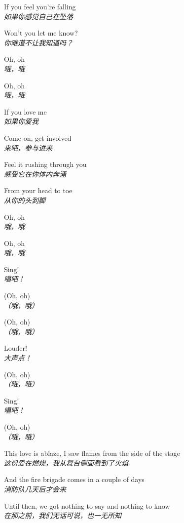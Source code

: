 \begin{spacing}{1.5}
\begin{flushleft}
If you feel you're falling\\
\textit{如果你感觉自己在坠落}\lyricspace

Won't you let me know?\\
\textit{你难道不让我知道吗？}\lyricspace

Oh, oh\\
\textit{哦，哦}\lyricspace

Oh, oh\\
\textit{哦，哦}\lyricspace

If you love me\\
\textit{如果你爱我}\lyricspace

Come on, get involved\\
\textit{来吧，参与进来}\lyricspace

Feel it rushing through you\\
\textit{感受它在你体内奔涌}\lyricspace

From your head to toe\\
\textit{从你的头到脚}\lyricspace

Oh, oh\\
\textit{哦，哦}\lyricspace

Oh, oh\\
\textit{哦，哦}\lyricspace

Sing!\\
\textit{唱吧！}\lyricspace

(Oh, oh)\\
\textit{（哦，哦）}\lyricspace

(Oh, oh)\\
\textit{（哦，哦）}\lyricspace

Louder!\\
\textit{大声点！}\lyricspace

(Oh, oh)\\
\textit{（哦，哦）}\lyricspace

Sing!\\
\textit{唱吧！}\lyricspace

(Oh, oh)\\
\textit{（哦，哦）}\lyricspace

This love is ablaze, I saw flames from the side of the stage\\
\textit{这份爱在燃烧，我从舞台侧面看到了火焰}\lyricspace

And the fire brigade comes in a couple of days\\
\textit{消防队几天后才会来}\lyricspace

Until then, we got nothing to say and nothing to know\\
\textit{在那之前，我们无话可说，也一无所知}\lyricspace


\end{flushleft}
\end{spacing}
